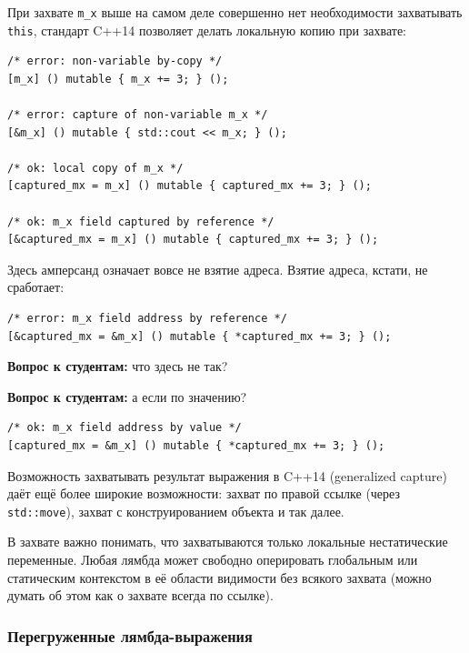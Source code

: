 \documentclass[a4paper,12pt,oneside]{article}
\newif\ifanswers
\begin{document}
При захвате \lstinline!m_x! выше на самом деле совершенно нет необходимости захватывать \lstinline!this!, стандарт C++14 позволяет делать локальную копию при захвате:

\begin{lstlisting}
/* error: non-variable by-copy */
[m_x] () mutable { m_x += 3; } (); 

/* error: capture of non-variable m_x */
[&m_x] () mutable { std::cout << m_x; } (); 

/* ok: local copy of m_x */
[captured_mx = m_x] () mutable { captured_mx += 3; } (); 

/* ok: m_x field captured by reference */
[&captured_mx = m_x] () mutable { captured_mx += 3; } (); 
\end{lstlisting}

Здесь амперсанд означает вовсе не взятие адреса. Взятие адреса, кстати, не сработает:

\begin{lstlisting}
/* error: m_x field address by reference */
[&captured_mx = &m_x] () mutable { *captured_mx += 3; } ();
\end{lstlisting}

\textbf{Вопрос к студентам:} что здесь не так?

\ifanswers
Правильный ответ следует из простого размышления: что вообще синтаксически должна означать запись в такой адрес? Перемещение поля класса, хм?
\fi

\textbf{Вопрос к студентам:} а если по значению?

\begin{lstlisting}
/* ok: m_x field address by value */
[captured_mx = &m_x] () mutable { *captured_mx += 3; } ();
\end{lstlisting}

\ifanswers
Правильный ответ: да, по значению все хорошо
\fi

Возможность захватывать результат выражения в C++14 (generalized capture) даёт ещё более широкие возможности: захват по правой ссылке (через \lstinline!std::move!), захват с конструированием объекта и так далее.

В захвате важно понимать, что захватываются только локальные нестатические переменные. Любая лямбда может свободно оперировать глобальным или статическим контекстом в её области видимости без всякого захвата (можно думать об этом как о захвате всегда по ссылке).

\subsubsection{Перегруженные лямбда-выражения}\label{OverLambdas}
\end{document}
